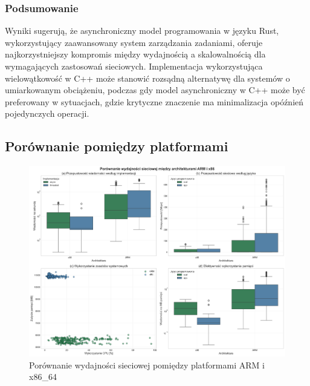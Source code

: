 \subsubsection{Podsumowanie}
Wyniki sugerują, że asynchroniczny model programowania w języku Rust, wykorzystujący zaawansowany system zarządzania zadaniami, oferuje najkorzystniejszy kompromis między wydajnością a skalowalnością dla wymagających zastosowań sieciowych. Implementacja wykorzystująca wielowątkowość w C++ może stanowić rozsądną alternatywę dla systemów o umiarkowanym obciążeniu, podczas gdy model asynchroniczny w C++ może być preferowany w sytuacjach, gdzie krytyczne znaczenie ma minimalizacja opóźnień pojedynczych operacji.

\subsection{Porównanie pomiędzy platformami}
\begin{figure}[H]
    \centering
    \includegraphics[width=\textwidth]{analiza/images/conc/echo/compare/rysunek_1_wydajnosc_sieciowa.png}
    \caption{Porównanie wydajności sieciowej pomiędzy platformami ARM i x86\_64}
    \label{rysunek_1_wydajnosc_sieciowa}
\end{figure}
